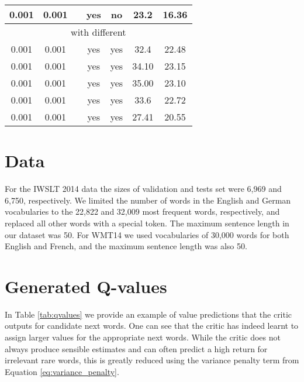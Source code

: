 \documentclass{article} \usepackage{iclr2017_conference,times}
\begin{document}
\begin{table}
\begin{tabular}{c  c  c  c  c  c c}
0.001 & 0.001 &  & yes & no & 23.2 & 16.36 \\
        \hline
        \multicolumn{7}{c}{with different } \\
0.001 & 0.001 &  & yes & yes & 32.4 & 22.48 \\
0.001 & 0.001 &  & yes & yes & 34.10 & 23.15 \\
0.001 & 0.001 &  & yes & yes & 35.00 & 23.10 \\
0.001 & 0.001 &  & yes & yes & 33.6 & 22.72 \\
0.001 & 0.001 &  & yes & yes & 27.41 & 20.55 \\
    \end{tabular}
    \label{tab:ablation}
\end{table}

\section{Data}
\label{sec:data}
For the IWSLT 2014 data the sizes of validation and tests set were 6,969 and 6,750, 
respectively. We limited the number of words in the English and German
vocabularies to the 22,822 and 32,009 most frequent words, respectively, and
replaced all other words with a special token. The maximum sentence length
in our dataset was 50. For WMT14 we used vocabularies of 30,000 words for both English and French, and the maximum sentence length was also 50.


\section{Generated Q-values}

In Table \ref{tab:qvalues} we provide an example of value predictions
that the critic outputs for candidate next words. One can see that the critic has
indeed learnt to assign larger values for the appropriate next words.
While the critic does not always produce sensible estimates and can often predict
a high return for irrelevant rare words, this is greatly reduced using the variance
penalty term from Equation \eqref{eq:variance_penalty}.
\end{document}
